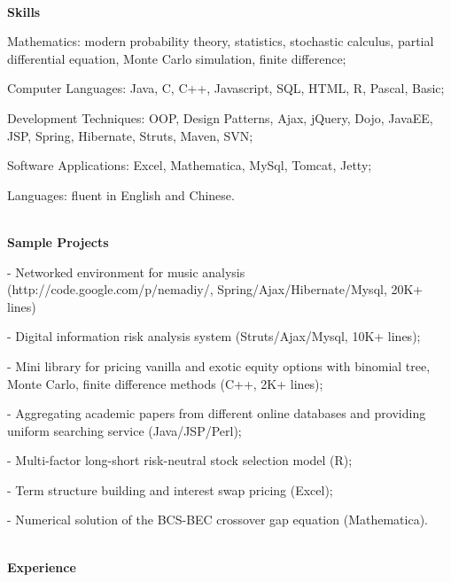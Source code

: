 \documentclass[9.5pt]{article}
\begin{document}
\hrulefill\\
\vspace{0.12in}
{\large \textbf{Skills}}

\begin{description*}
\item[Mathematics:]
modern probability theory, statistics, stochastic calculus, partial differential equation, Monte Carlo simulation,  finite difference;  
\item[Computer Languages:]
 Java, C, C++,  Javascript, SQL, HTML,    R, Pascal,  Basic;
 \item[Development Techniques:]
OOP, Design Patterns,  Ajax,   jQuery, Dojo, JavaEE,  JSP, Spring, Hibernate, Struts, Maven, SVN;
\item[Software Applications:]
Excel,   Mathematica, MySql, Tomcat, Jetty;
\item[Languages:]
fluent in English and Chinese.

\end{description*}
\hrulefill\\
\vspace{0.12in}
{\large \textbf{Sample Projects}}

\begin{itemize*}
\item[-] Networked environment for music analysis ({http://code.google.com/p/nemadiy/}, Spring/Ajax/Hibernate/Mysql, 20K+ lines)
\item[-] Digital information risk analysis system (Struts/Ajax/Mysql, 10K+ lines);
\item[-] Mini library for pricing vanilla and exotic equity options with binomial tree, Monte Carlo, finite difference methods (C++, 2K+ lines);
\item[-] Aggregating academic papers from different online databases and providing uniform searching service (Java/JSP/Perl);
\item[-] Multi-factor long-short risk-neutral stock selection model (R);
\item[-] Term structure building and interest swap pricing (Excel); 
\item[-] Numerical solution of the BCS-BEC crossover gap equation (Mathematica).
\end{itemize*}
\hrulefill\\
\vspace{0.12in}
{\large \textbf{Experience}}
\end{document}
